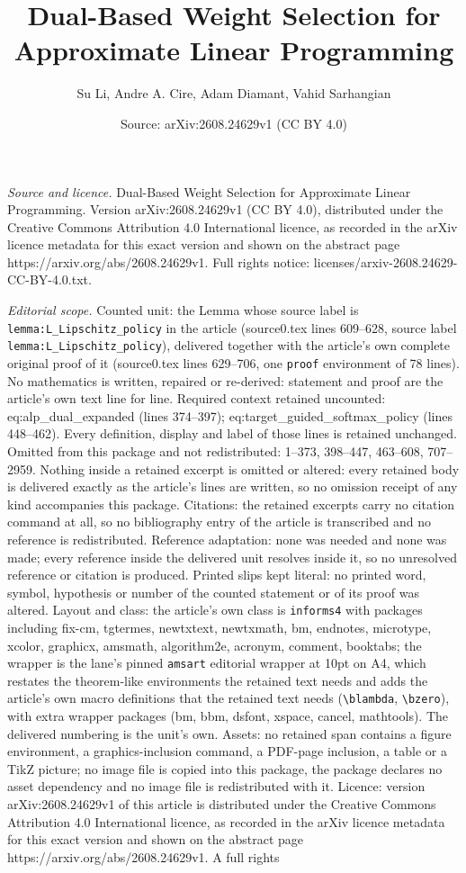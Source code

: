 \documentclass[10pt,a4paper]{amsart}
\title[Dual-Based Weight Selection for Approximate Linear Programmi]{Dual-Based Weight Selection for Approximate Linear Programming}
\author{Su Li, Andre A. Cire, Adam Diamant, Vahid Sarhangian}
\date{Source: arXiv:2608.24629v1 (CC BY 4.0)}
\begin{document}
\maketitle

\noindent\emph{Source and licence.} Dual-Based Weight Selection for Approximate Linear Programming. Version arXiv:2608.24629v1 (CC BY 4.0), distributed under the Creative Commons Attribution 4.0 International licence, as recorded in the arXiv licence metadata for this exact version and shown on the abstract page https://arxiv.org/abs/2608.24629v1. Full rights notice: licenses/arxiv-2608.24629-CC-BY-4.0.txt.\par\smallskip

\noindent\textit{Editorial scope.} Counted unit: the Lemma whose source label is \texttt{lemma:L\_Lipschitz\_policy} in the article (source0.tex lines 609--628, source label \texttt{lemma:L\_Lipschitz\_policy}), delivered together with the article's own complete original proof of it (source0.tex lines 629--706, one \texttt{proof} environment of 78 lines). No mathematics is written, repaired or re-derived: statement and proof are the article's own text line for line. Required context retained uncounted: eq:alp\_dual\_expanded (lines 374--397); eq:target\_guided\_softmax\_policy (lines 448--462). Every definition, display and label of those lines is retained unchanged. Omitted from this package and not redistributed: 1--373, 398--447, 463--608, 707--2959. Nothing inside a retained excerpt is omitted or altered: every retained body is delivered exactly as the article's lines are written, so no omission receipt of any kind accompanies this package. Citations: the retained excerpts carry no citation command at all, so no bibliography entry of the article is transcribed and no reference is redistributed. Reference adaptation: none was needed and none was made; every reference inside the delivered unit resolves inside it, so no unresolved reference or citation is produced. Printed slips kept literal: no printed word, symbol, hypothesis or number of the counted statement or of its proof was altered. Layout and class: the article's own class is \texttt{informs4} with packages including fix-cm, tgtermes, newtxtext, newtxmath, bm, endnotes, microtype, xcolor, graphicx, amsmath, algorithm2e, acronym, comment, booktabs; the wrapper is the lane's pinned \texttt{amsart} editorial wrapper at 10pt on A4, which restates the theorem-like environments the retained text needs and adds the article's own macro definitions that the retained text needs (\texttt{\textbackslash blambda}, \texttt{\textbackslash bzero}), with extra wrapper packages (bm, bbm, dsfont, xspace, cancel, mathtools). The delivered numbering is the unit's own. Assets: no retained span contains a figure environment, a graphics-inclusion command, a PDF-page inclusion, a table or a TikZ picture; no image file is copied into this package, the package declares no asset dependency and no image file is redistributed with it. Licence: version arXiv:2608.24629v1 of this article is distributed under the Creative Commons Attribution 4.0 International licence, as recorded in the arXiv licence metadata for this exact version and shown on the abstract page https://arxiv.org/abs/2608.24629v1. A full rights 
\end{document}
